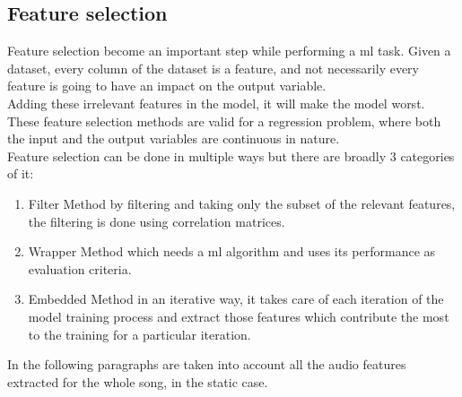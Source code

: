 \subsection{Feature selection}
Feature selection become an important step while performing a \gls{ml} task. Given a dataset, every column of the dataset is a feature, and not necessarily every feature is going to have an impact on the output variable.
\\
Adding these irrelevant features in the model, it will make the model worst.
\\
These feature selection methods are valid for a regression problem, where both the input and the output variables are continuous in nature.
\\ \indent
Feature selection can be done in multiple ways but there are broadly 3 categories of it:
\begin{enumerate}
	\item Filter Method by filtering and taking only the subset of the relevant features, the filtering is done using correlation matrices. 
	\item Wrapper Method which needs a \gls{ml} algorithm and uses its performance as evaluation criteria.
	\item Embedded Method in an iterative way, it takes care of each iteration of the model training process and extract those features which contribute the most to the training for a particular iteration.
\end{enumerate}
In the following paragraphs are taken into account all the audio features extracted for the whole song, in the static case.

